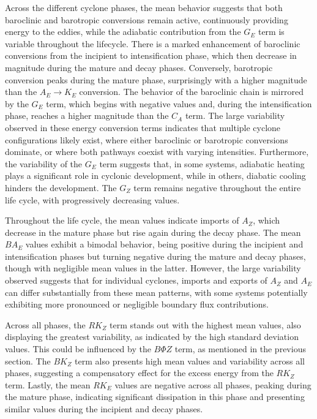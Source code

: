 \documentclass[pdflatex,sn-chicago]{sn-jnl}%
\theoremstyle{plain}
\theoremstyle{definition}
\theoremstyle{remark}
\theoremstyle{definition}
\begin{document}
Across the different cyclone phases, the mean behavior suggests that both baroclinic and barotropic conversions remain active, continuously providing energy to the eddies, while the adiabatic contribution from the $G_E$ term is variable throughout the lifecycle. There is a marked enhancement of baroclinic conversions from the incipient to intensification phase, which then decrease in magnitude during the mature and decay phases. Conversely, barotropic conversion peaks during the mature phase, surprisingly with a higher magnitude than the $A_E \rightarrow K_E$ conversion. The behavior of the baroclinic chain is mirrored by the $G_E$ term, which begins with negative values and, during the intensification phase, reaches a higher magnitude than the $C_A$ term. The large variability observed in these energy conversion terms indicates that multiple cyclone configurations likely exist, where either baroclinic or barotropic conversions dominate, or where both pathways coexist with varying intensities. Furthermore, the variability of the $G_E$ term suggests that, in some systems, adiabatic heating plays a significant role in cyclonic development, while in others, diabatic cooling hinders the development. The $G_Z$ term remains negative throughout the entire life cycle, with progressively decreasing values.

Throughout the life cycle, the mean values indicate imports of $A_Z$, which decrease in the mature phase but rise again during the decay phase. The mean $BA_E$ values exhibit a bimodal behavior, being positive during the incipient and intensification phases but turning negative during the mature and decay phases, though with negligible mean values in the latter. However, the large variability observed suggests that for individual cyclones, imports and exports of $A_Z$ and $A_E$ can differ substantially from these mean patterns, with some systems potentially exhibiting more pronounced or negligible boundary flux contributions.

Across all phases, the $RK_Z$ term stands out with the highest mean values, also displaying the greatest variability, as indicated by the high standard deviation values. This could be influenced by the $B\Phi Z$ term, as mentioned in the previous section. The $BK_Z$ term also presents high mean values and variability across all phases, suggesting a compensatory effect for the excess energy from the $RK_Z$ term. Lastly, the mean $RK_E$ values are negative across all phases, peaking during the mature phase, indicating significant dissipation in this phase and presenting similar values during the incipient and decay phases.
\end{document}
